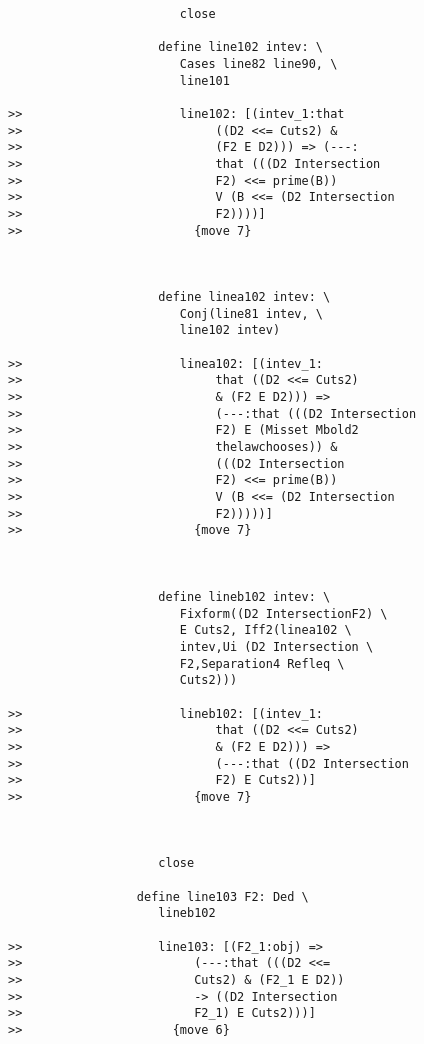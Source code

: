 \documentclass[12pt]{article}
\begin{document}
\begin{verbatim}
                        close

                     define line102 intev: \
                        Cases line82 line90, \
                        line101

>>                      line102: [(intev_1:that
>>                           ((D2 <<= Cuts2) &
>>                           (F2 E D2))) => (---:
>>                           that (((D2 Intersection
>>                           F2) <<= prime(B))
>>                           V (B <<= (D2 Intersection
>>                           F2))))]
>>                        {move 7}



                     define linea102 intev: \
                        Conj(line81 intev, \
                        line102 intev)

>>                      linea102: [(intev_1:
>>                           that ((D2 <<= Cuts2)
>>                           & (F2 E D2))) =>
>>                           (---:that (((D2 Intersection
>>                           F2) E (Misset Mbold2
>>                           thelawchooses)) &
>>                           (((D2 Intersection
>>                           F2) <<= prime(B))
>>                           V (B <<= (D2 Intersection
>>                           F2)))))]
>>                        {move 7}



                     define lineb102 intev: \
                        Fixform((D2 IntersectionF2) \
                        E Cuts2, Iff2(linea102 \
                        intev,Ui (D2 Intersection \
                        F2,Separation4 Refleq \
                        Cuts2)))

>>                      lineb102: [(intev_1:
>>                           that ((D2 <<= Cuts2)
>>                           & (F2 E D2))) =>
>>                           (---:that ((D2 Intersection
>>                           F2) E Cuts2))]
>>                        {move 7}



                     close

                  define line103 F2: Ded \
                     lineb102

>>                   line103: [(F2_1:obj) =>
>>                        (---:that (((D2 <<=
>>                        Cuts2) & (F2_1 E D2))
>>                        -> ((D2 Intersection
>>                        F2_1) E Cuts2)))]
>>                     {move 6}




\end{verbatim}
\end{document}
